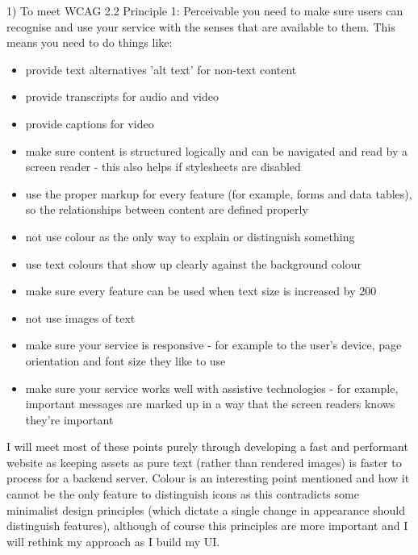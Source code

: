 1)
To meet WCAG 2.2 Principle 1: Perceivable you need to make sure users can recognise and use your service with the senses that are available to them.
This means you need to do things like:
\begin{itemize}
    \item provide text alternatives 'alt text' for non-text content
    \item provide transcripts for audio and video
    \item provide captions for video
    \item make sure content is structured logically and can be navigated and read by a screen reader - this also helps if stylesheets are disabled
    \item use the proper markup for every feature (for example, forms and data tables), so the relationships between content are defined properly
    \item not use colour as the only way to explain or distinguish something
    \item use text colours that show up clearly against the background colour
    \item make sure every feature can be used when text size is increased by 200%
    \item not use images of text
    \item make sure your service is responsive - for example to the user's device, page orientation and font size they like to use
    \item make sure your service works well with assistive technologies - for example, important messages are marked up in a way that the screen readers knows they're important
\end{itemize}
I will meet most of these points purely through developing a fast and performant website as keeping assets as pure text (rather than rendered images) is faster to process for a backend server. Colour is an interesting point mentioned and how it cannot be the only feature to distinguish icons as this contradicts some minimalist design principles (which dictate a single change in appearance should distinguish features), although of course this principles are more important and I will rethink my approach as I build my UI.

